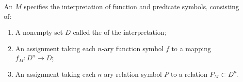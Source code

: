 \begin{definition}\label{fol-0006}%
An  $M$ specifies the interpretation of function and
predicate symbols, consisting of:
\begin{enumerate}
\item A nonempty set $D$ called the  of the interpretation;
\item An assignment taking each $n$-ary function symbol $f$ to a mapping
  $f_{M}\colon D^{n}\to D$;
\item An assignment taking each $n$-ary relation symbol $P$ to a
  relation $P_{M}\subset D^{n}$.
\end{enumerate}
\end{definition}
